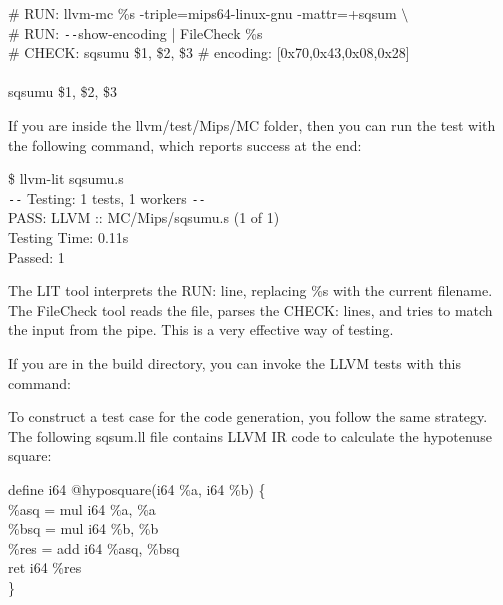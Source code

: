 \begin{tcolorbox}[colback=white,colframe=black]
# RUN: llvm-mc \%s -triple=mips64-linux-gnu -mattr=+sqsum $\setminus$ \\
# RUN: \verb|--|show-encoding | FileCheck \%s \\
# CHECK: sqsumu \$1, \$2, \$3 \# encoding: [0x70,0x43,0x08,0x28] \\
\\
\hspace*{1cm}sqsumu \$1, \$2, \$3
\end{tcolorbox}

If you are inside the llvm/test/Mips/MC folder, then you can run the test with the following command, which reports success at the end:\par

\begin{tcolorbox}[colback=white,colframe=black]
\$ llvm-lit sqsumu.s \\
\verb|--| Testing: 1 tests, 1 workers \verb|--| \\
PASS: LLVM :: MC/Mips/sqsumu.s (1 of 1) \\
Testing Time: 0.11s \\
\hspace*{0.5cm}Passed: 1
\end{tcolorbox}

The LIT tool interprets the RUN: line, replacing \%s with the current filename. The FileCheck tool reads the file, parses the CHECK: lines, and tries to match the input from the pipe. This is a very effective way of testing.\par

If you are in the build directory, you can invoke the LLVM tests with this command:\par

To construct a test case for the code generation, you follow the same strategy. The following sqsum.ll file contains LLVM IR code to calculate the hypotenuse square:\par

\begin{tcolorbox}[colback=white,colframe=black]
define i64 @hyposquare(i64 \%a, i64 \%b) \{ \\
\hspace*{0.5cm}\%asq = mul i64 \%a, \%a \\
\hspace*{0.5cm}\%bsq = mul i64 \%b, \%b \\
\hspace*{0.5cm}\%res = add i64 \%asq, \%bsq \\
\hspace*{0.5cm}ret i64 \%res \\
\}
\end{tcolorbox}

